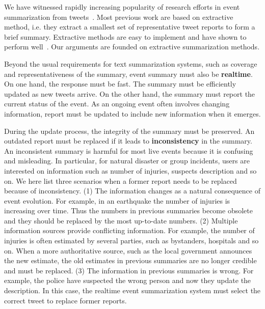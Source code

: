 \documentclass[envcountsame]{llncs}
\begin{document}
We have witnessed rapidly increasing popularity of research efforts in event summarization from tweets~\cite{Takamura2011Summarizing,Lin2012Generating,Rudra2015Extracting,Shou2013Sumblr,Liu2016LEDS,Gillani2017Post,Zubiaga2012Towards,Sharifi2010Summarizing}.   Most previous work are based on extractive method, i.e. they extract a smallest set of representative tweet reports to form a brief summary. Extractive methods are easy to implement and have shown to perform well~\cite{Takamura2011Summarizing,Lin2012Generating,Rudra2015Extracting,Shou2013Sumblr,Liu2016LEDS,Gillani2017Post,Zubiaga2012Towards}. Our arguments are founded on extractive summarization methods.

Beyond the usual requirements for text summarization systems, such as coverage and representativeness of the summary,  event summary must also be \textbf{realtime}. On one hand, the response must be fast. The summary must be efficiently updated as new tweets arrive. On the other hand, the summary must report the current status of the event. As an ongoing event often involves changing information, report must be updated to include new information when it emerges.

During the update process, the integrity of the summary must be preserved.  An outdated report must be replaced if it leads to \textbf{inconsistency} in the summary. An inconsistent summary is harmful for most live events because it is confusing and misleading. In particular, for natural disaster or group incidents,  users are interested on  information such as number of injuries, suspects description and so on. We here list three scenarios when a former report needs to be replaced because of inconsistency. (1) The information changes as a natural consequence of event evolution. For example, in an earthquake the number of injuries is increasing over time. Thus the numbers in previous summaries become obsolete and they should be replaced by the most up-to-date numbers. (2) Multiple information sources provide conflicting information. For example, the number of injuries is often estimated by several parties, such as  bystanders, hospitals and so on. When a more authoritative source, such as the local government announces the new estimate, the old estimates in previous summaries are no longer credible and must be replaced. (3) The information in previous summaries is wrong. For example, the police have suspected the wrong person and now they update the description. In this case, the realtime event summarization system must select the correct tweet to replace former reports.
\end{document}
